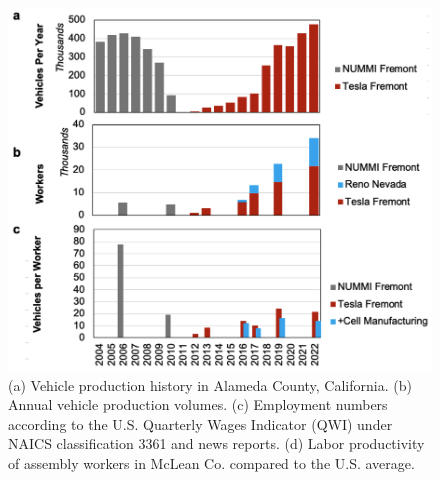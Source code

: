 \documentclass[sn-mathphys,Numbered]{sn-jnl}%
\begin{document}
\begin{appendices}
\begin{figure}[ht]
\centering
\includegraphics[width=1.0\linewidth]{figures/fig_alameda_reno.png}
\caption{(a) Vehicle production history in Alameda County, California. (b) Annual vehicle production volumes. (c) Employment numbers according to the U.S. Quarterly Wages Indicator (QWI) under NAICS classification 3361 and news reports. (d) Labor productivity of assembly workers in McLean Co. compared to the U.S. average.}
\label{fig:alameda-cell}
\end{figure}


\label{sec:news-reports}


\end{appendices}
\end{document}
